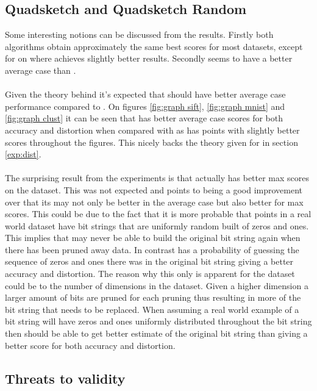 \subsection{Quadsketch and Quadsketch Random}
Some interesting notions can be discussed from the results. Firstly both algorithms obtain approximately the same best scores for most datasets, except for on \mnist{} where \qsr{} achieves slightly better results. 
Secondly \qsr{} seems to have a better average case than \qs{}. 
\\
\\
Given the theory behind \qsr{} it's expected that \qsr{} should have better average case performance compared to \qs{}. On figures \ref{fig:graph sift}, \ref{fig:graph mnist} and \ref{fig:graph clust} it can be seen that \qsr{} has better average case scores for both accuracy and distortion when compared with \qs{} as \qsr{} has points with slightly better scores throughout the figures. This nicely backs the theory given for \qsr{} in section \ref{exp:dist}.
\\
\\
The surprising result from the experiments is that \qsr{} actually has better max scores on the \mnist dataset. This was not expected and points to \qsr{} being a good improvement over \qs{} that its may not only be better in the average case but also better for max scores. This could be due to the fact that it is more probable that points in a real world dataset have bit strings that are uniformly random built of zeros and ones. This implies that \qs{} may never be able to build the original bit string again when there has been pruned away data. In contrast \qsr{} has a probability of guessing the sequence of zeros and ones there was in the original bit string giving a better accuracy and distortion. The reason why this only is apparent for the \mnist{} dataset could be to the number of dimensions in the dataset. Given a higher dimension a larger amount of bits are pruned for each pruning thus resulting in more of the bit string that needs to be replaced. When assuming a real world example of a bit string will have zeros and ones uniformly distributed throughout the bit string then \qsr{} should be able to get better estimate of the original bit string than \qs{} giving a better score for both accuracy and distortion. 



\subsection{Threats to validity}


